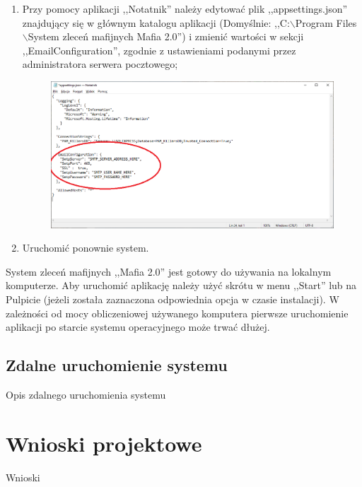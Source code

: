 \documentclass[12pt,a4paper]{article}
\begin{document}
\begin{enumerate}
\begin{figure}[H]
					\end{figure}				
				\item Przy pomocy aplikacji ,,Notatnik'' należy edytować plik ,,appsettings.json'' znajdujący się w głównym katalogu aplikacji (Domyślnie:
						,,C:$\backslash$Program Files$\backslash$System zleceń mafijnych Mafia 2.0'') i zmienić wartości w sekcji ,,EmailConfiguration'', zgodnie z ustawieniami podanymi 									przez administratora serwera pocztowego;\\
					\begin{figure}[H]
						\includegraphics[scale=0.5]{img/Local_Install_13.png}
						\centering
					\end{figure}				
				\item Uruchomić ponownie system.
			\end{enumerate}
			System zleceń mafijnych ,,Mafia 2.0'' jest gotowy do używania na lokalnym komputerze. Aby uruchomić aplikację należy użyć skrótu w menu ,,Start'' lub na Pulpicie (jeżeli została 						zaznaczona odpowiednia opcja w czasie instalacji). W zależności od mocy obliczeniowej używanego komputera pierwsze uruchomienie aplikacji po starcie systemu operacyjnego
				może trwać dłużej.		
		\subsection{Zdalne uruchomienie systemu}
			Opis zdalnego uruchomienia systemu
	
	\section{Wnioski projektowe}
		Wnioski
\end{document}
